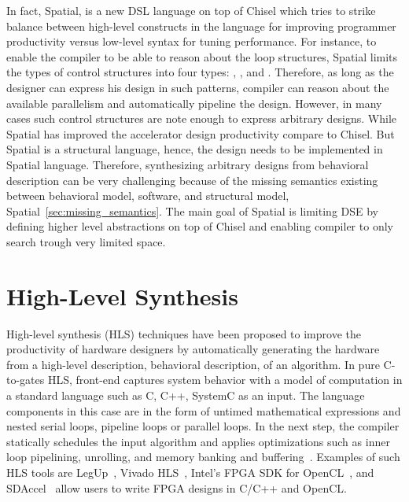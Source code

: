 In fact, Spatial, is a new DSL language on top of Chisel which tries to strike balance between high-level constructs in the language for improving programmer productivity versus low-level syntax for tuning performance. 
For instance, to enable the compiler to be able to reason about the loop structures, Spatial limits the types of control structures into four types: , ,  and .
Therefore, as long as the designer can express his design in such patterns, compiler can reason about the available parallelism and automatically pipeline the design.
However, in many cases such control structures are note enough to express arbitrary designs.
While Spatial has improved the accelerator design productivity compare to Chisel.
But Spatial is a structural language, hence, the design needs to be implemented in Spatial language.
Therefore, synthesizing arbitrary designs from behavioral description can be very challenging because of the missing semantics existing between behavioral model, software, and structural model, Spatial~\ref{sec:missing_semantics}.
The main goal of Spatial is limiting DSE by defining higher level abstractions on top of Chisel and enabling compiler to only search trough very limited space.

\section{High-Level Synthesis}

High-level synthesis (HLS) techniques have been proposed to improve the productivity of hardware designers by automatically generating the hardware from a high-level description, behavioral description, of an algorithm.
In pure C-to-gates HLS, front-end captures system behavior with a model of computation in a standard language such as C, C++, SystemC as an input.
The language components in this case are in the form of untimed mathematical expressions and nested serial loops, pipeline loops or parallel loops.
In the next step, the compiler statically schedules the input algorithm and applies optimizations such as inner loop pipelining, unrolling, and memory banking and buffering~\cite{chung_micro_2010, lee_1989_new, paulin_1989_force}.
Examples of such HLS tools are LegUp~\cite{canis_2011_legup}, Vivado HLS~\cite{vivadohls}, Intel’s FPGA SDK for OpenCL~\cite{opencl_sdk}, and SDAccel~\cite{sdaccel} allow users to write FPGA designs in C/C++ and OpenCL.

